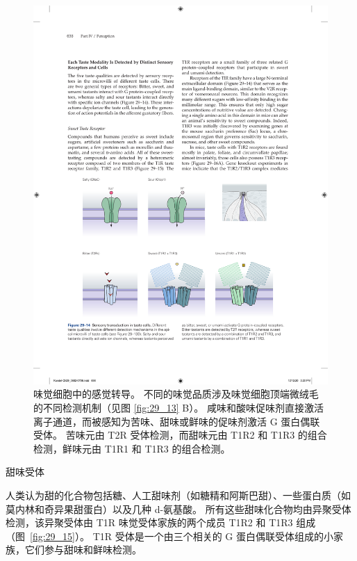 \begin{figure}[htbp]
	\centering
	\includegraphics[width=0.75\linewidth]{chap29/fig_29_14}
	\caption{味觉细胞中的感觉转导。 不同的味觉品质涉及味觉细胞顶端微绒毛的不同检测机制（见图 \ref{fig:29_13} B）。 咸味和酸味促味剂直接激活离子通道，而被感知为苦味、甜味或鲜味的促味剂激活 G 蛋白偶联受体。 苦味元由 T2R 受体检测，而甜味元由 T1R2 和 T1R3 的组合检测，鲜味元由 T1R1 和 T1R3 的组合检测。}
	\label{fig:29_14}
\end{figure}


甜味受体

人类认为甜的化合物包括糖、人工甜味剂（如糖精和阿斯巴甜）、一些蛋白质（如莫内林和奇异果甜蛋白）以及几种 d-氨基酸。
所有这些甜味化合物均由异聚受体检测，该异聚受体由 T1R 味觉受体家族的两个成员 T1R2 和 T1R3 组成（图~\ref{fig:29_15}）。
T1R 受体是一个由三个相关的 G 蛋白偶联受体组成的小家族，它们参与甜味和鲜味检测。


